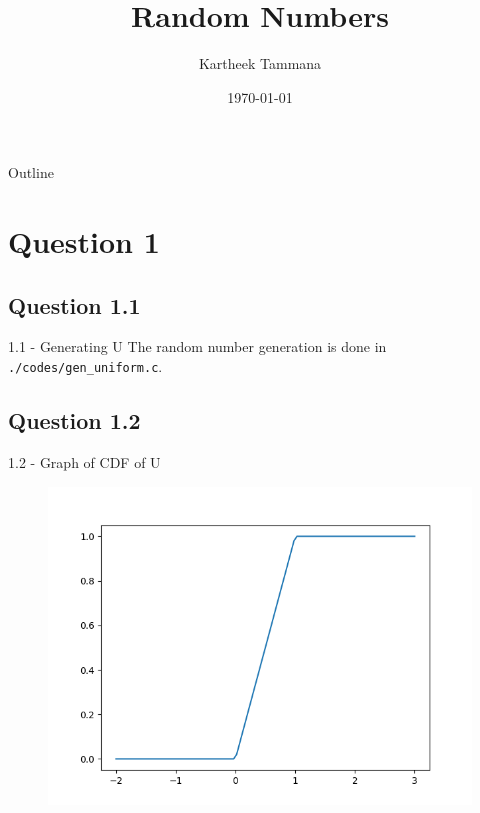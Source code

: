 \documentclass{beamer}
\title{Random Numbers}
\author{Kartheek Tammana}
\date{\today}
\begin{document}
\begin{frame}
    \titlepage
\end{frame}

\logo{}

\begin{frame}{Outline}
    \tableofcontents
\end{frame}

\section{Question 1}
\subsection{Question 1.1}
\begin{frame}{1.1 - Generating U}
    The random number generation is done in \texttt{./codes/gen\_uniform.c}.
\end{frame}

\subsection{Question 1.2}
\begin{frame}{1.2 - Graph of CDF of U}
    \begin{figure}[!ht]
        \includegraphics[width=\textheight]{figs/cdf_uni.png}
    \end{figure}
\end{frame}
\end{document}
